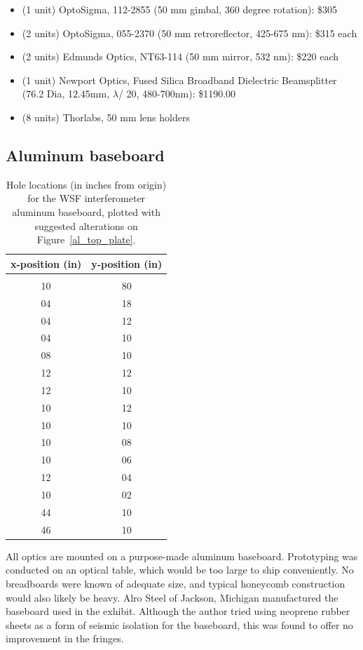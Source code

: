 \begin{itemize}
\item (1 unit) OptoSigma, 112-2855 (50 mm gimbal, 360 degree rotation): \$305
\item (2 units) OptoSigma, 055-2370 (50 mm retroreflector, 425-675 nm): \$315 each
\item (2 units) Edmunds Optics, NT63-114 (50 mm mirror, 532 nm): \$220 each
\item (1 unit) Newport Optics, Fused Silica Broadband Dielectric Beamsplitter (76.2 Dia, 12.45mm, $\lambda$/
  20, 480-700nm): \$1190.00 
\item (8 units) Thorlabs, 50 mm lens holders
\end{itemize}

        \subsection{Aluminum baseboard}
        \label{baseplate}



\begin{table}[t]
\begin{center}
\begin{tabular}{ c c }
x-position (in) & y-position (in) \\
\hline \\
10 & 80\\
04 & 18\\
04 & 12\\
04 & 10\\
08 & 10\\
12 & 12\\
12 & 10\\
10 & 12\\
10 & 10\\
10 & 08\\
10 & 06\\
12 & 04\\
10 & 02\\
44 & 10\\
46 & 10 \\
\hline
\end{tabular}
\caption{Hole locations (in inches from origin) for the WSF interferometer aluminum baseboard, plotted with suggested alterations on Figure~\ref{al_top_plate}.}
\label{aluminum_baseboard_hole_locations}
\end{center}
\end{table}

All optics are mounted on a purpose-made aluminum baseboard.
Prototyping was conducted on an optical table, which would be too large to ship conveniently.
No breadboards were known of adequate size, and typical honeycomb construction would also likely be heavy.
Alro Steel of Jackson, Michigan manufactured the baseboard used in the exhibit.
Although the author tried using neoprene rubber sheets as a form of seismic isolation for the baseboard, this was found to offer no improvement in the fringes.

